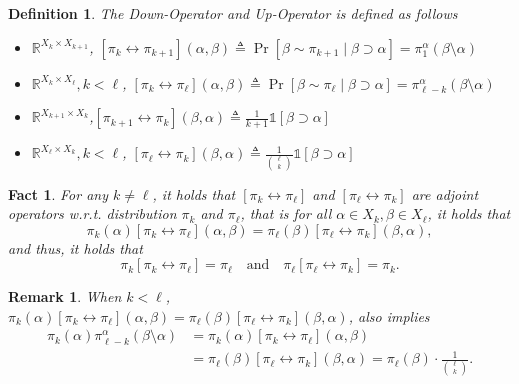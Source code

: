 \documentclass{article}
\newtheorem{define}{Definition}[section]
\newtheorem{fact}{Fact}[section]
\newtheorem{remark}{Remark}[section]
\def\Op#1#2{\left[#1 \leftrightarrow #2\right]}
\begin{document}
\begin{define} The Down-Operator and Up-Operator is defined as follows
  \begin{itemize}
  \item$\mathbb{R}^{X_k \times X_{k+1}}$, $\Op{\pi_k}{\pi_{k+1}}(\alpha, \beta)  \triangleq \Pr[\beta\sim \pi_{k+1} \;|\; \beta\supset\alpha] = \pi^\alpha_1(\beta\setminus\alpha)$
  \item$\mathbb{R}^{X_k \times X_{\ell}}, k < \ell$, $\Op{\pi_k}{\pi_\ell}(\alpha, \beta) \triangleq \Pr[\beta\sim\pi_{\ell} \;|\; \beta\supset\alpha] = \pi^\alpha_{\ell-k}(\beta\setminus \alpha)$
  \item$\mathbb{R}^{X_{k+1} \times X_{k}}$,$\Op{\pi_{k+1}}{\pi_k}(\beta, \alpha) \triangleq \frac{1}{k+1} \mathbb{1}[\beta\supset\alpha]$
  \item$\mathbb{R}^{X_\ell \times X_k}, k < \ell$, $\Op{\pi_\ell}{\pi_k}(\beta, \alpha) \triangleq \frac{1}{\binom{\ell}{k}}\mathbb{1}[\beta\supset\alpha]$
  \end{itemize}
\end{define}

\begin{fact}
  For any $k \not= \ell$, it holds that $\Op{\pi_k}{\pi_\ell}$ and $\Op{\pi_\ell}{\pi_k}$ are adjoint operators w.r.t. distribution $\pi_k$ and $\pi_\ell$, that is for all $\alpha \in X_k, \beta \in X_\ell$, it holds that
  \[\pi_k(\alpha) \Op{\pi_k}{\pi_\ell}(\alpha, \beta) = \pi_\ell(\beta)\Op{\pi_\ell}{\pi_k}(\beta,\alpha),\]
  and thus, it holds that
  \[\pi_k \Op{\pi_k}{\pi_\ell} = \pi_\ell \quad \text{and} \quad \pi_\ell \Op{\pi_\ell}{\pi_k} = \pi_k.\]
\end{fact}
\begin{remark}
  When $k < \ell$, $\pi_k(\alpha) \Op{\pi_k}{\pi_\ell}(\alpha, \beta) = \pi_\ell(\beta)\Op{\pi_\ell}{\pi_k}(\beta,\alpha)$, 
  also implies 
  \begin{align*}
    \pi_k(\alpha) \pi^{\alpha}_{\ell-k}(\beta\setminus \alpha)
    &= \pi_k(\alpha) \Op{\pi_k}{\pi_\ell}(\alpha, \beta) \\
    &= \pi_\ell(\beta)\Op{\pi_\ell}{\pi_k}(\beta,\alpha)
    = \pi_\ell(\beta) \cdot \frac{1}{\binom{\ell}{k}}.
  \end{align*}
\end{remark}
\end{document}

